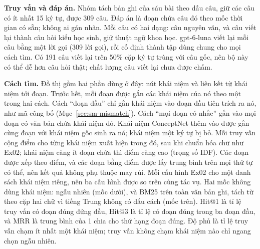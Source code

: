 \textbf{Truy vấn và đáp án.}
Nhóm tách bản ghi của sáu bài theo dấu câu, giữ các câu có ít nhất 15 ký tự, được 309 câu.
Đáp án là đoạn chứa câu đó theo mốc thời gian có sẵn; không ai gán nhãn.
Mỗi câu có hai dạng: câu nguyên văn, và câu viết lại thành câu hỏi kiểu học sinh, giữ thuật ngữ khoa học.
gpt-6-luna viết lại mỗi câu bằng một lời gọi (309 lời gọi), rồi cố định thành tập dùng chung cho mọi cách tìm.
Có 191 câu viết lại trên 50\% cặp ký tự trùng với câu gốc, nên bộ này có thể dễ hơn câu hỏi thật; chất lượng câu viết lại chưa được chấm.

\textbf{Cách tìm.}
Đồ thị gồm hai phần dùng ở đây: nút khái niệm và liên kết từ khái niệm tới đoạn.
Trước hết, mỗi đoạn được gắn các khái niệm của nó theo một trong hai cách.
Cách ``đoạn đầu'' chỉ gắn khái niệm vào đoạn đầu tiên trích ra nó, như mã công bố (Mục~\ref{sec:sm-mismatch}).
Cách ``mọi đoạn có nhắc'' gắn vào mọi đoạn có văn bản chứa khái niệm đó.
Khái niệm ConceptNet thêm vào được gắn cùng đoạn với khái niệm gốc sinh ra nó; khái niệm một ký tự bị bỏ.
Mỗi truy vấn cộng điểm cho từng khái niệm xuất hiện trong đó, sau khi chuẩn hóa chữ như Ex02; khái niệm càng ít đoạn chứa thì điểm càng cao (trọng số IDF).
Các đoạn được xếp theo điểm, và các đoạn bằng điểm được lấy trung bình trên mọi thứ tự có thể, nên kết quả không phụ thuộc may rủi.
Mỗi cấu hình Ex02 cho một danh sách khái niệm riêng, nên ba cấu hình được so trên cùng tác vụ.
Hai mốc không dùng khái niệm: ngẫu nhiên (mốc dưới), và BM25 trên toàn văn bản ghi, tách từ theo cặp hai chữ vì tiếng Trung không có dấu cách (mốc trên).
Hit@1 là tỉ lệ truy vấn có đoạn đúng đứng đầu, Hit@3 là tỉ lệ có đoạn đúng trong ba đoạn đầu, và MRR là trung bình của 1 chia cho thứ hạng đoạn đúng.
Độ phủ là tỉ lệ truy vấn chạm ít nhất một khái niệm; truy vấn không chạm khái niệm nào chỉ ngang chọn ngẫu nhiên.

\begin{table}[t]
\centering
\caption{Ex03: tìm đúng đoạn bài giảng, trung bình sáu bài (309 truy vấn mỗi loại). Mốc dưới là ngẫu nhiên, mốc trên là BM25 trên toàn văn bản ghi.}
\label{tab:sm-ex03}
\footnotesize
\setlength{\tabcolsep}{3pt}

\end{table}

